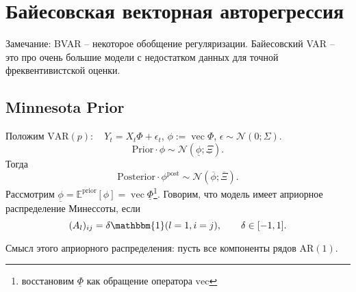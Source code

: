 \section{Байесовская векторная авторегрессия}
    Замечание: BVAR -- некоторое обобщение регуляризации. Байесовский VAR -- это про очень большие модели с недостатком данных для точной фреквентивистской оценки.
    \subsection{Minnesota Prior}
        \begin{definition}
            Положим $\mathrm{VAR}(p): \quad Y_t = X_t \Phi + \epsilon_t$, $\phi := \operatorname{vec} \Phi$, $\epsilon \sim \mathcal{N}(0; \Sigma)$.
            \begin{equation*}
                \mathrm{Prior}\cdot \phi \sim \mathcal{N}(\underline{\phi}; \underline{\Xi}).
            \end{equation*}
            Тогда 
            \begin{equation*}
                \mathrm{Posterior}\cdot \phi^{\text{post}} \sim \mathcal{N}(\overline{\phi}; \overline{\Xi}).
            \end{equation*}
            Рассмотрим $\underline \phi = \mathbb{E}^{\text{prior}}\left[\phi\right] = \operatorname{vec}\underline{\Phi}$\footnote{восстановим $\underline{\Phi}$ как обращение оператора $\mathrm{vec}$}.
            Говорим, что модель имеет априорное распределение Минессоты, если 
            \begin{equation*}
                (A_l)_{ij} = \delta\mathbbm{1}(l=1, i=j), \qquad \delta \in [-1, 1].
            \end{equation*}
        \end{definition}

        \begin{remark}
            Смысл этого априорного распределения: пусть все компоненты рядов $\mathrm{AR}(1)$.
        \end{remark}

